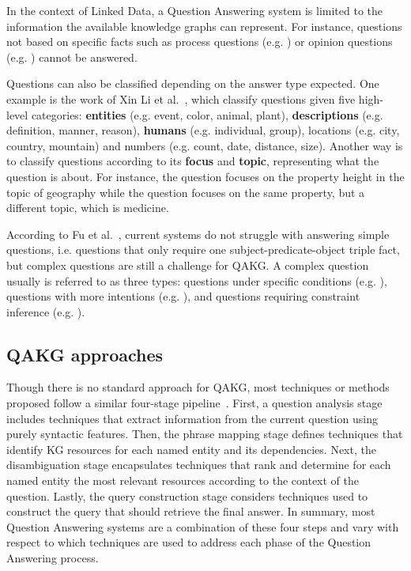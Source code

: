 In the context of Linked Data, a Question Answering system is limited to the information the 
available knowledge graphs can represent. For instance, questions not based on specific facts 
such as process questions (e.g. ) or opinion questions 
(e.g. ) cannot be answered.

Questions can also be classified depending on the answer type expected. One example is the work 
of Xin Li et al.~\cite{qa:LiR02}, which classify questions given five high-level categories: 
\textbf{entities} (e.g. event, color, animal, plant), \textbf{descriptions} (e.g. definition, 
manner, reason), \textbf{humans} (e.g. individual, group), locations (e.g. city, country, 
mountain) and numbers (e.g. count, date, distance, size). Another way is to classify questions 
according to its \textbf{focus} and \textbf{topic}, representing what the question is about. 
For instance, the question  focuses on the 
property height in the topic of geography while the question  focuses on the same property, but a different topic, which is medicine.

According to Fu et al.~\cite{qa:FuQTLYS20abs-2007-13069}, current systems do not struggle with 
answering simple questions, i.e. questions that only require one subject-predicate-object 
triple fact, but complex questions are still a challenge for QAKG. A complex question usually 
is referred to as three types: questions under specific conditions (e.g. ), questions with more intentions (e.g. 
), and questions requiring constraint inference (e.g. ).

\subsection{QAKG approaches}
\label{cap2:qakg/approaches}
Though there is no standard approach for QAKG, most techniques or methods proposed follow a 
similar four-stage pipeline~\cite{qa:core-techniques-DiefenbachLSM18}. First, a question 
analysis stage includes techniques that extract information from the current question using 
purely syntactic features. Then, the phrase mapping stage defines techniques that identify KG 
resources for each named entity and its dependencies. Next, the disambiguation stage 
encapsulates techniques that rank and determine for each named entity the most relevant 
resources according to the context of the question. Lastly, the query construction stage 
considers techniques used to construct the \SPARQL{} query that should retrieve the final answer. 
In summary, most Question Answering systems are a combination of these four steps and vary with 
respect to which techniques are used to address each phase of the Question Answering process.


